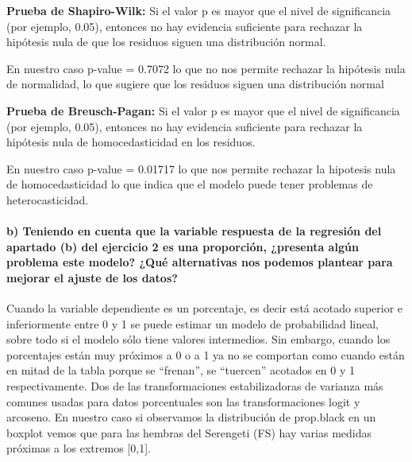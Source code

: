 \documentclass[
]{article}
\begin{document}
\textbf{Prueba de Shapiro-Wilk:} Si el valor p es mayor que el nivel de
significancia (por ejemplo, 0.05), entonces no hay evidencia suficiente
para rechazar la hipótesis nula de que los residuos siguen una
distribución normal.

En nuestro caso p-value = 0.7072 lo que no nos permite rechazar la
hipótesis nula de normalidad, lo que sugiere que los residuos siguen una
distribución normal

\textbf{Prueba de Breusch-Pagan:} Si el valor p es mayor que el nivel de
significancia (por ejemplo, 0.05), entonces no hay evidencia suficiente
para rechazar la hipótesis nula de homocedasticidad en los residuos.

En nuestro caso p-value = 0.01717 lo que nos permite rechazar la
hipotesis nula de homocedasticidad lo que indica que el modelo puede
tener problemas de heterocasticidad.

\hypertarget{b-teniendo-en-cuenta-que-la-variable-respuesta-de-la-regresiuxf3n-del-apartado-b-del-ejercicio-2-es-una-proporciuxf3n-presenta-alguxfan-problema-este-modelo-quuxe9-alternativas-nos-podemos-plantear-para-mejorar-el-ajuste-de-los-datos}{%
\paragraph{\texorpdfstring{\textbf{b) Teniendo en cuenta que la variable
respuesta de la regresión del apartado (b) del ejercicio 2 es una
proporción, ¿presenta algún problema este modelo? ¿Qué alternativas nos
podemos plantear para mejorar el ajuste de los
datos?}}{b) Teniendo en cuenta que la variable respuesta de la regresión del apartado (b) del ejercicio 2 es una proporción, ¿presenta algún problema este modelo? ¿Qué alternativas nos podemos plantear para mejorar el ajuste de los datos?}}\label{b-teniendo-en-cuenta-que-la-variable-respuesta-de-la-regresiuxf3n-del-apartado-b-del-ejercicio-2-es-una-proporciuxf3n-presenta-alguxfan-problema-este-modelo-quuxe9-alternativas-nos-podemos-plantear-para-mejorar-el-ajuste-de-los-datos}}

Cuando la variable dependiente es un porcentaje, es decir está acotado
superior e inferiormente entre 0 y 1 se puede estimar un modelo de
probabilidad lineal, sobre todo si el modelo sólo tiene valores
intermedios. Sin embargo, cuando los porcentajes están muy próximos a 0
o a 1 ya no se comportan como cuando están en mitad de la tabla porque
se ``frenan'', se ``tuercen'' acotados en 0 y 1 respectivamente. Dos de
las transformaciones estabilizadoras de varianza más comunes usadas para
datos porcentuales son las transformaciones logit y arcoseno. En nuestro
caso si observamos la distribución de prop.black en un boxplot vemos que
para las hembras del Serengeti (FS) hay varias medidas próximas a los
extremos {[}0,1{]}.
\end{document}

